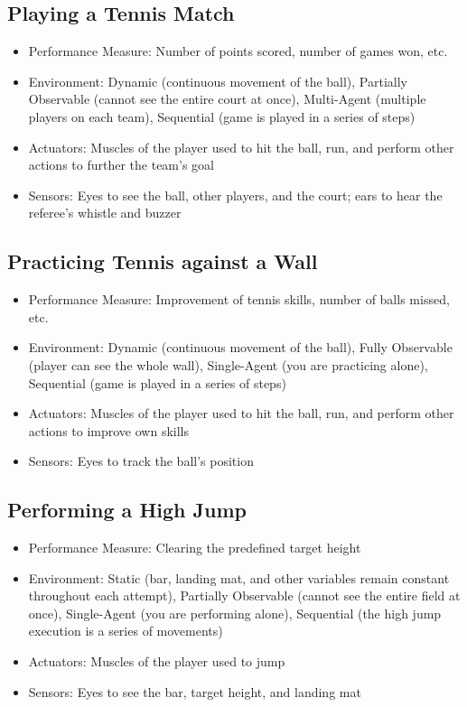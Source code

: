 \documentclass{article}
\begin{document}
\subsection*{Playing a Tennis Match}

\begin{itemize}
    \item Performance Measure: Number of points scored, number of games won, etc.
    \item Environment: Dynamic (continuous movement of the ball), Partially Observable (cannot see the entire court at once), Multi-Agent (multiple players on each team), Sequential (game is played in a series of steps)
    \item Actuators: Muscles of the player used to hit the ball, run, and perform other actions to further the team's goal
    \item Sensors: Eyes to see the ball, other players, and the court; ears to hear the referee's whistle and buzzer
\end{itemize}

\subsection*{Practicing Tennis against a Wall}

\begin{itemize}
    \item Performance Measure: Improvement of tennis skills, number of balls missed, etc.
    \item Environment: Dynamic (continuous movement of the ball), Fully Observable (player can see the whole wall), Single-Agent (you are practicing alone), Sequential (game is played in a series of steps)
    \item Actuators: Muscles of the player used to hit the ball, run, and perform other actions to improve own skills
    \item Sensors: Eyes to track the ball's position
\end{itemize}

\subsection*{Performing a High Jump}

\begin{itemize}
    \item Performance Measure: Clearing the predefined target height
    \item Environment: Static (bar, landing mat, and other variables remain constant throughout each attempt), Partially Observable (cannot see the entire field at once), Single-Agent (you are performing alone), Sequential (the high jump execution is a series of movements)
    \item Actuators: Muscles of the player used to jump
    \item Sensors: Eyes to see the bar, target height, and landing mat
\end{itemize}
\end{document}
